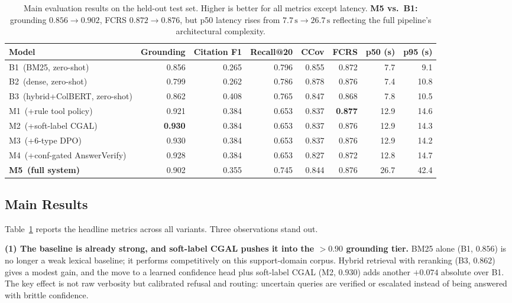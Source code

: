 \documentclass[11pt,a4paper,twocolumn]{article}
\begin{document}
\begin{table}[t]
\centering
\footnotesize
\setlength{\tabcolsep}{4.5pt}
\begin{tabular}{lrrrrrrr}
\toprule
\textbf{Model} & \textbf{Grounding} & \textbf{Citation F1} & \textbf{Recall@20} & \textbf{CCov}\footnotemark[1] & \textbf{FCRS} & \textbf{p50 (s)} & \textbf{p95 (s)} \\
\midrule
B1 \,(BM25, zero-shot)            & 0.856 & 0.265 & 0.796 & 0.855 & 0.872 & 7.7  & 9.1 \\
B2 \,(dense, zero-shot)           & 0.799 & 0.262 & 0.786 & 0.878 & 0.876 & 7.4  & 10.8 \\
B3 \,(hybrid+ColBERT, zero-shot)  & 0.862 & 0.408 & 0.765 & 0.847 & 0.868 & 7.8  & 10.5 \\
\midrule
M1 \,(+rule tool policy)          & 0.921 & 0.384 & 0.653 & 0.837 & \textbf{0.877} & 12.9 & 14.6 \\
M2 \,(+soft-label CGAL)           & \textbf{0.930} & 0.384 & 0.653 & 0.837 & 0.876 & 12.9 & 14.3 \\
M3 \,(+6-type DPO)                & 0.930 & 0.384 & 0.653 & 0.837 & 0.876 & 12.9 & 14.2 \\
M4 \,(+conf-gated AnswerVerify)   & 0.928 & 0.384 & 0.653 & 0.827 & 0.872 & 12.8 & 14.7 \\
\textbf{M5 \,(full system)}       & 0.902 & 0.355 & 0.745 & 0.844 & 0.876 & 26.7 & 42.4 \\
\bottomrule
\end{tabular}
\caption{Main evaluation results on the held-out test set. Higher is better for all metrics except latency. \textbf{M5 vs.\ B1:} grounding $0.856 \to 0.902$, FCRS $0.872 \to 0.876$, but p50 latency rises from $7.7\,\text{s} \to 26.7\,\text{s}$ reflecting the full pipeline's architectural complexity.}\label{tab:main}
\end{table}

\subsection{Main Results}

Table~\ref{tab:main} reports the headline metrics across all variants.
Three observations stand out.

\textbf{(1) The baseline is already strong, and soft-label CGAL pushes it
into the $>0.90$ grounding tier.} BM25 alone (B1, $0.856$) is no longer a
weak lexical baseline; it performs competitively on this support-domain
corpus. Hybrid retrieval with reranking (B3, $0.862$) gives a modest gain,
and the move to a learned confidence head plus soft-label CGAL (M2,
$\mathbf{0.930}$) adds another $+0.074$ absolute over B1. The key effect is
not raw verbosity but calibrated refusal and routing: uncertain queries are
verified or escalated instead of being answered with brittle confidence.
\end{document}
